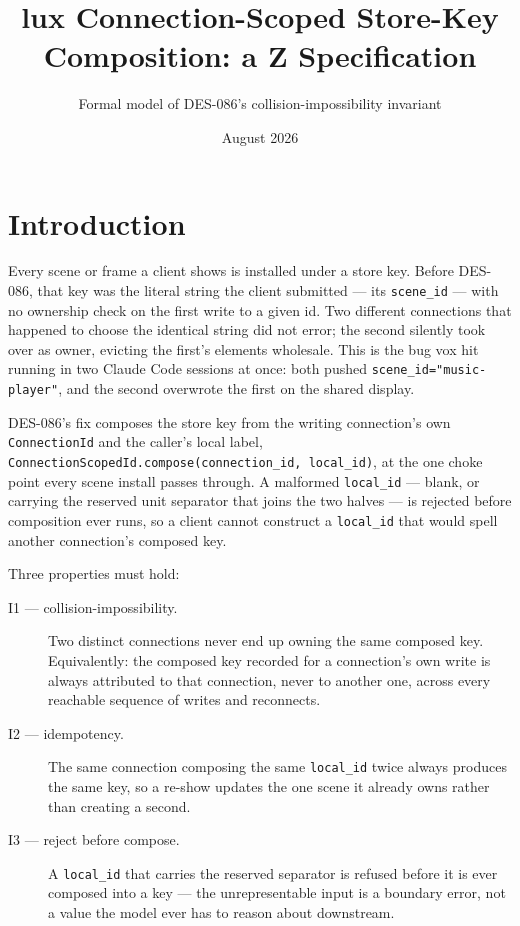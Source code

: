 \documentclass[a4paper,10pt,fleqn]{article}
\begin{document}
\title{lux Connection-Scoped Store-Key Composition: a Z Specification}
\author{Formal model of DES-086's collision-impossibility invariant}
\date{August 2026}
\maketitle

\section{Introduction}

Every scene or frame a client shows is installed under a store key. Before
DES-086, that key was the literal string the client submitted --- its
\texttt{scene\_id} --- with no ownership check on the first write to a given
id. Two different connections that happened to choose the identical string did
not error; the second silently took over as owner, evicting the first's
elements wholesale. This is the bug vox hit running in two Claude Code sessions
at once: both pushed \texttt{scene\_id="music-player"}, and the second overwrote
the first on the shared display.

DES-086's fix composes the store key from the writing connection's own
\texttt{ConnectionId} and the caller's local label,
\texttt{ConnectionScopedId.compose(connection\_id, local\_id)}, at the one
choke point every scene install passes through. A malformed \texttt{local\_id}
--- blank, or carrying the reserved unit separator that joins the two halves
--- is rejected before composition ever runs, so a client cannot construct a
\texttt{local\_id} that would spell another connection's composed key.

Three properties must hold:

\begin{description}
  \item[I1 --- collision-impossibility.] Two distinct connections never end up
    owning the same composed key. Equivalently: the composed key recorded for
    a connection's own write is always attributed to that connection, never to
    another one, across every reachable sequence of writes and reconnects.
  \item[I2 --- idempotency.] The same connection composing the same
    \texttt{local\_id} twice always produces the same key, so a re-show
    updates the one scene it already owns rather than creating a second.
  \item[I3 --- reject before compose.] A \texttt{local\_id} that carries the
    reserved separator is refused before it is ever composed into a key ---
    the unrepresentable input is a boundary error, not a value the model ever
    has to reason about downstream.
\end{description}
\end{document}
